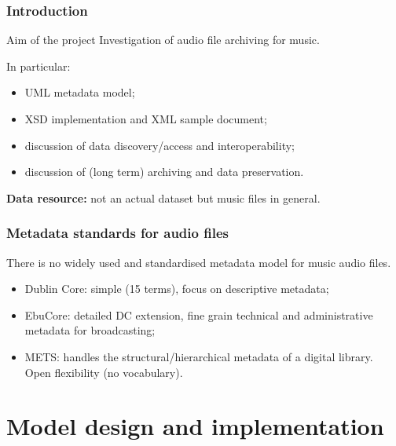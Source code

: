 \documentclass{beamer}
\newcommand\rb[1]{\textcolor{ThemeRed}{\textbf{#1}}}
\begin{document}
  \begin{frame}
    \frametitle{Introduction}

    \begin{block}{Aim of the project}
      Investigation of audio file archiving for music.
    \end{block}

    \vspace{1em}

    In particular:
    \begin{itemize}
      \item UML metadata model;
      \item XSD implementation and XML sample document;
      \item discussion of data discovery/access and interoperability;
      \item discussion of (long term) archiving and data preservation.
    \end{itemize}

    \vspace{1em}

    \rb{Data resource:} not an actual dataset but music files in general.

  \end{frame}



  \begin{frame}
    \frametitle{Metadata standards for audio files}

    There is no widely used and standardised metadata model for music audio files.

    \vspace{1em}

    \begin{itemize}
      \itemsep1em
      \item Dublin Core: simple (15 terms), focus on descriptive metadata;
      \item EbuCore: detailed DC extension, fine grain technical and administrative metadata for broadcasting;
      \item METS: handles the structural/hierarchical metadata of a digital library. Open flexibility (no vocabulary).
    \end{itemize}
  \end{frame}



\section{Model design and implementation}
\end{document}
